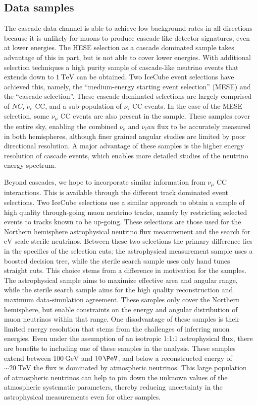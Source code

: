 \subsection{Data samples}
The cascade data channel is able to achieve low background rates in all directions because it is unlikely for muons to produce cascade-like detector signatures, even at lower energies.
The HESE selection as a cascade dominated sample takes advantage of this in part, but is not able to cover lower energies.
With additional selection techniques a high purity sample of cascade-like neutrino events that extends down to $\SI{1}\TeV$ can be obtained.
Two IceCube event selections have achieved this, namely, the ``medium-energy starting event selection'' (MESE) and the ``cascade selection''.
These cascade dominated selections are largely comprised of $NC$, $\nu_e$ CC, and a sub-population of $\nu_\tau$ CC events.
In the case of the MESE selection, some $\nu_\mu$ CC events are also present in the sample.
These samples cover the entire sky, enabling the combined $\nu_e$ and $\nu_tau$ flux to be accurately measured in both hemispheres, although finer grained angular studies are limited by poor directional resolution.
A major advantage of these samples is the higher energy resolution of cascade events, which enables more detailed studies of the neutrino energy spectrum.

Beyond cascades, we hope to incorporate similar information from $\nu_\mu$ CC interactions.
This is available through the different track dominated event selections.
Two IceCube selections use a similar approach to obtain a sample of high quality through-going muon neutrino tracks, namely by restricting selected events to tracks known to be up-going.
These selections are those used for the Northern hemisphere astrophysical neutrino flux measurement and the search for $\si\eV$ scale sterile neutrinos.
Between these two selections the primary difference lies in the specifics of the selection cuts; the astrophysical measurement sample uses a boosted decision tree, while the sterile search sample uses only hand tunes straight cuts.
This choice stems from a difference in motivation for the samples.
The astrophysical sample aims to maximize effective area and angular range, while the sterile search sample aims for the high quality reconstruction and maximum data-simulation agreement.
These samples only cover the Northern hemisphere, but enable constraints on the energy and angular distribution of muon neutrinos within that range.
One disadvantage of these samples is their limited energy resolution that stems from the challenges of inferring muon energies.
Even under the assumption of an isotropic 1:1:1 astrophysical flux, there are benefits to including one of these samples in the analysis.
These samples extend between $\SI{100}\GeV$ and $\SI{10}\PeV$, and below a reconstructed energy of $\sim\SI{20}\TeV$ the flux is dominated by atmospheric neutrinos.
This large population of atmospheric neutrinos can help to pin down the unknown values of the atmospheric systematic parameters, thereby reducing uncertainty in the astrophysical measurements even for other samples.

